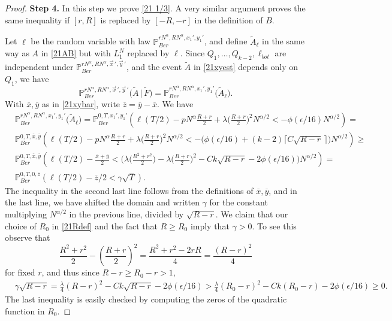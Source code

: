 \begin{proof}
		\noindent\textbf{Step 4.} In this step we prove \eqref{21 1/3}. A very similar argument proves the same inequality if $[r,R]$ is replaced by $[-R,-r]$ in the definition of $B$. 
		
		Let $\ell$ be the random variable with law $\mathbb{P}^{rN^\alpha,RN^\alpha,x_1',y_1'}_{Ber}$, and define $\tilde{A}_\ell$ in the same way as $A$ in \eqref{21AB} but with $L_1^N$ replaced by $\ell$. Since $Q_1,\dots,Q_{k-2},\ell_{bot}$ are independent under $\mathbb{P}^{rN^\alpha, RN^\alpha,\vec{x}\,',\vec{y}\,'}_{Ber}$, and the event $\tilde A$ in \eqref{21xyest} depends only on $Q_1$, we have
		\begin{equation}\label{21indep}
		\mathbb{P}^{rN^\alpha, RN^\alpha,\vec{x}\,',\vec{y}\,'}_{Ber}\big(\tilde A\,\big|\,\tilde F \big) = \mathbb{P}^{rN^\alpha, RN^\alpha,x_1',y_1'}_{Ber}\big(\tilde{A}_\ell\big).
		\end{equation} 
		With $\overline{x},\overline{y}$ as in \eqref{21xybar}, write $\overline{z} = \overline{y}-\overline{x}$. We have
		\begin{equation} \label{21convex}
		\begin{split}
		& \mathbb{P}^{rN^\alpha, RN^\alpha,x_1',y_1'}_{Ber} \big(\tilde A_\ell\big)
		= \mathbb{P}^{0,T,x_1',y_1'}_{Ber} \left(\ell(T/2) - pN^\alpha \frac{R+r}{2} + \lambda\Big(\frac{R+r}{2}\Big)^2 N^{\alpha/2} < -\phi(\epsilon/16)N^{\alpha/2}\right) =\\
		& \mathbb{P}^{0,T,\overline{x},\overline{y}}_{Ber}\left(\ell(T/2) - pN^\alpha\frac{R+r}{2} + \lambda\Big(\frac{R+r}{2}\Big)^2 N^{\alpha/2} < -\big(\phi(\epsilon/16) + (k-2)\lceil C\sqrt{R-r}\,\rceil\big)N^{\alpha/2}\right) \geq\\
		& \mathbb{P}^{0,T,\overline{x},\overline{y}}_{Ber}\left(\ell(T/2) - \frac{\overline{x} + \overline{y}}{2} < \Big( \lambda\Big(\frac{R^2+r^2}{2}\Big) - \lambda\Big(\frac{R+r}{2}\Big)^2 - Ck\sqrt{R-r} - 2\phi(\epsilon/16)\Big)N^{\alpha/2}\right) = \\
		&\mathbb{P}^{0,T,0,\overline{z}}_{Ber}\left(\ell(T/2) - \overline{z}/2 < \gamma\sqrt{T}\right).
		\end{split}
		\end{equation}
		The inequality in the second last line follows from the definitions of $\overline{x},\overline{y}$, and in the last line, we have shifted the domain and written $\gamma$ for the constant multiplying $N^{\alpha/2}$ in the previous line, divided by $\sqrt{R-r}$. We claim that our choice of $R_0$ in \eqref{21Rdef} and the fact that $R\geq R_0$ imply that $\gamma > 0$. To see this observe that
		\[
		\frac{R^2+r^2}{2} - \left(\frac{R+r}{2}\right)^2 = \frac{R^2 + r^2-2rR}{4} = \frac{(R-r)^2}{4}
		\]
		for fixed $r$, and thus since $R-r \geq R_0-r > 1$,
		\begin{align*}
		&\gamma\sqrt{R-r} = \frac{\lambda}{4}(R-r)^2 - Ck\sqrt{R-r} - 2\phi(\epsilon/16) > \frac{\lambda}{4}(R_0-r)^2 - Ck(R_0-r) - 2\phi(\epsilon/16) \geq 0.
		\end{align*} 
		The last inequality is easily checked by computing the zeros of the quadratic function in $R_0$.
		

\end{proof}

